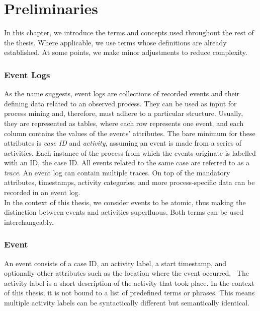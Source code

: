 
\section{Preliminaries}\label{sec:back}
In this chapter, we introduce the terms and concepts used throughout the rest of the thesis. Where applicable, we use terms whose definitions are already established. At some points, we make minor adjustments to reduce complexity. 
\subsubsection*{Event Logs}\label{sec:event-log}
As the name suggests, event logs are collections of recorded events and their defining data related to an observed process. They can be used as input for process mining and, therefore, must adhere to a particular structure. Usually, they are represented as tables, where each row represents one event, and each column contains the values of the events' attributes. The bare minimum for these attributes is \emph{case ID} and \emph{activity}, assuming an event is made from a series of activities. Each instance of the process from which the events originate is labelled with an ID, the case ID. All events related to the same case are referred to as a \emph{trace}. An event log can contain multiple traces. On top of the mandatory attributes, timestamps, activity categories, and more process-specific data can be recorded in an event log.~\cite{van_der_aalst_process_2016}\\
In the context of this thesis, we consider events to be atomic, thus making the distinction between events and activities superfluous. Both terms can be used interchangeably.

\subsubsection*{Event}\label{sec:event}
An event consists of a case ID, an activity label, a start timestamp, and optionally other attributes such as the location where the event occurred.~\cite{van_der_aalst_process_2016} The activity label is a short description of the activity that took place. In the context of this thesis, it is not bound to a list of predefined terms or phrases. This means multiple activity labels can be syntactically different but semantically identical.

